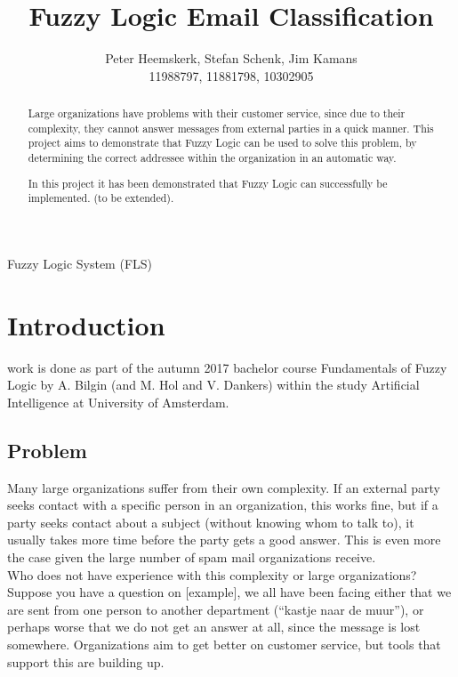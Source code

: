 \documentclass[journal]{IEEEtran}
\begin{document}
\title{Fuzzy Logic Email Classification}
\author{Peter Heemskerk, Stefan Schenk, Jim Kamans\\11988797, 11881798, 10302905}


\maketitle

\begin{abstract}
Large organizations have problems with their customer service, since due to their complexity, they cannot answer messages from external parties in a quick manner. This project aims to demonstrate that Fuzzy Logic can be used to solve this problem, by determining the correct addressee within the organization in an automatic way.

In this project it has been demonstrated that Fuzzy Logic can successfully be implemented. (to be extended).
\end{abstract}

\begin{IEEEkeywords}
Fuzzy Logic System (FLS)
\end{IEEEkeywords}

\section{Introduction}
 work is done as part of the autumn 2017 bachelor course Fundamentals of Fuzzy Logic by A. Bilgin (and  M. Hol and V. Dankers) within the study Artificial Intelligence at University of Amsterdam.

\subsection{Problem}
Many large organizations suffer from their own complexity. If an external party seeks contact with a specific person in an organization, this works fine, but if a party seeks contact about a subject (without knowing whom to talk to), it usually takes more time before the party gets a good answer. This is even more the case given the large number of spam mail organizations receive.\\

Who does not have experience with this complexity or large organizations? Suppose you have a question on [example], we all have been facing either that we are sent from one person to another department (``kastje naar de muur''), or perhaps worse that we do not get an answer at all, since the message is lost somewhere. Organizations aim to get better on customer service, but tools that support this are building up. \\
\end{document}
